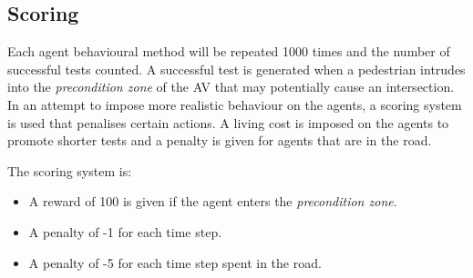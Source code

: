 \documentclass[letterpaper, 10 pt, journal, twoside]{IEEEtran}
\begin{document}
\subsection{Scoring}
Each agent behavioural method will be repeated 1000 times and the number of successful tests counted. A successful test is generated when a pedestrian intrudes into the \textit{precondition zone} of the AV that may potentially cause an intersection. %
In an attempt to impose more realistic behaviour on the agents, a scoring system is used that penalises certain actions. A living cost is imposed on the agents to promote shorter tests and a penalty is given for agents that are in the road.

The scoring system is:
\begin{itemize}
  \item A reward of 100 is given if the agent enters the \textit{precondition zone}.
  \item A penalty of -1 for each time step.
  \item A penalty of -5 for each time step spent in the road.
\end{itemize}


%


\end{document}
